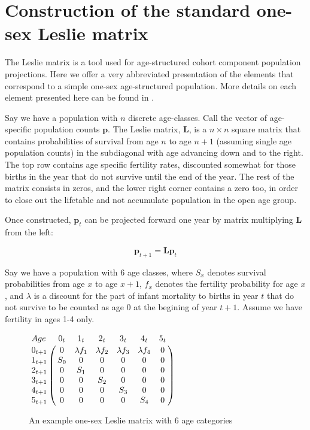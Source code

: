 \chapter{Construction of the standard one-sex Leslie matrix}
\label{Appendix:Caswell}
The Leslie matrix\citep{leslie1945use} is a tool used for age-structured cohort 
component population projections. Here we offer a very abbreviated presentation of the elements that
correspond to a simple one-sex age-structured population. More details on 
each element presented here can be found in \cite{caswell2001matrix}.

Say we have a population with $n$ discrete age-classes. Call the vector of
age-specific population counts $\textbf{p}$. The Leslie matrix, $\textbf{L}$, is a $n \times
n$ square matrix that contains probabilities of survival from age $n$ to age
$n+1$ (assuming single age population counts) in the subdiagonal with age
advancing down and to the right. The top row contains age specific fertility
rates, discounted somewhat for those births in the year that do not survive
until the end of the year. The rest of the matrix consists in zeros, and the
lower right corner contains a zero too, in order to close out the lifetable and
not accumulate population in the open age group.

Once constructed, $\textbf{p}_t$ can be projected forward one year by matrix
multiplying $\textbf{L}$ from the left:

\begin{equation}
\textbf{p}_{t+1} = \textbf{L}\textbf{p}_{t} 
\end{equation}

Say we have a population with 6 age classes, where
$S_x$ denotes survival probabilities from age $x$ to age $x+1$, $f_x$ denotes
the fertility probability for age $x$, and $\lambda$ is a discount for the part
of infant mortality to births in year $t$ that do not survive to be counted as
age 0 at the begining of year $t+1$. Assume we have fertility in ages 1-4 only.

\begin{figure}
\centering
\caption*{An example one-sex Leslie matrix with 6 age categories}
$\bordermatrix{{Age }      & 0_t & 1_t     & 2_t &  3_t & 4_t & 5_t\cr
                0_{t+1} & 0 & \lambda f_1 & \lambda f_2 & \lambda f_3 & \lambda f_4 & 0\cr 
                1_{t+1} & S_0  &  0       & 0    & 0     & 0   & 0   \cr
                2_{t+1} & 0    &  S_1     & 0    & 0     & 0    & 0   \cr 
                3_{t+1} & 0    &  0       & S_2  & 0     & 0    & 0   \cr 
                4_{t+1} & 0    &  0       & 0    & S_3   & 0    & 0   \cr
                5_{t+1} & 0    &  0       & 0    & 0     & S_4  & 0   }$
\end{figure}

